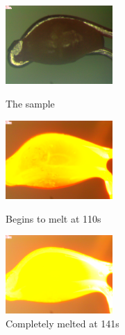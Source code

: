 \documentclass{apmcmthesis}
\begin{document}
	\begin{figure}[htbp!]
	\begin{minipage}{0.33\linewidth}
		\centering
		\includegraphics[height=3cm]{./figures/1-1.PNG}
		\caption{The sample}
		\label{fig:1}
	\end{minipage}
	\begin{minipage}{0.33\linewidth}
		\centering
		\includegraphics[height=3cm]{./figures/1-2.PNG}
		\caption{Begins to melt at 110s}
		\label{fig:2}
	\end{minipage}
	\begin{minipage}{0.33\linewidth}
	\centering
	\includegraphics[height=3cm]{./figures/1-3.PNG}
	\caption{Completely melted at 141s}
	\label{fig:3}
\end{minipage}
\end{figure}
\end{document}
